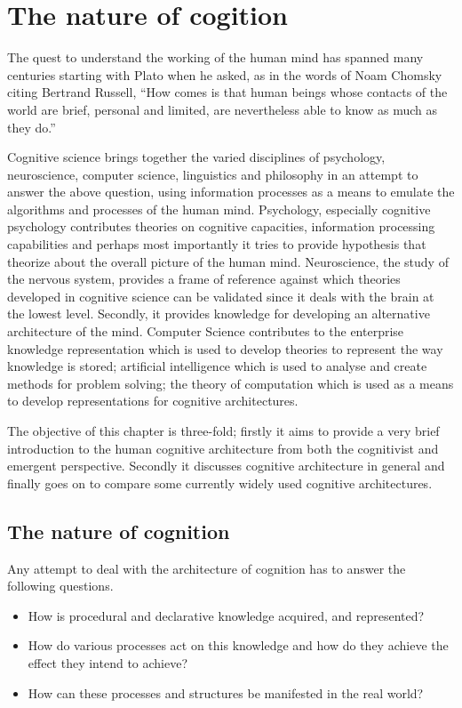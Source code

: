 \chapter{The nature of cogition}
\label{The_nature_of_cognition}

The quest to understand the working of the human mind has spanned
many centuries starting with Plato when he asked, as in the words of
Noam Chomsky citing Bertrand Russell, ``How comes is that human beings
whose contacts of the world are brief, personal and limited, are
nevertheless able to know as much as they do.'' \cite{Bogdan:1993aa}

Cognitive science brings together the varied disciplines of
psychology, neuroscience, computer science, linguistics and philosophy in an
attempt to answer the above question, using information processes as a
means to emulate the algorithms and processes of the human
mind. Psychology, especially cognitive psychology contributes theories
on cognitive capacities, information processing capabilities and
perhaps most importantly it tries to provide hypothesis that theorize
about the overall picture of the human mind. Neuroscience, the study
of the nervous system,  provides a frame of reference against which
theories developed in cognitive science can be validated since it
deals with the brain at the lowest level. Secondly, it provides  knowledge
for developing an alternative architecture of the mind. Computer
Science contributes to the enterprise knowledge representation which is
used to develop theories to represent the way knowledge is stored;
artificial intelligence which is used to analyse and create methods
for problem solving; the theory of computation which is used as a
means to develop representations for cognitive
architectures.

The objective of this chapter is three-fold; firstly it aims
to provide a very brief introduction to the human cognitive
architecture from both the cognitivist and
emergent\cite{DBLP:journals/tec/VernonMS07} perspective. Secondly
it discusses cognitive architecture in general and finally goes on
to compare some currently widely used cognitive architectures.

\section{The nature of cognition}
\label{nature_Of_Cognition}
Any attempt to deal with the architecture of cognition has to answer
the following questions.

\begin{itemize}
\item How is procedural and declarative knowledge acquired, and
represented?
\item How do various processes act on this knowledge and how do they
achieve the effect they intend to achieve?
\item How can these processes and structures be manifested in the real
world?
\end{itemize}

